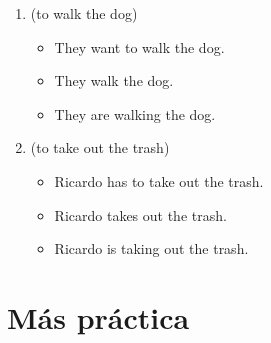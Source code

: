 \begin{enumerate}
\begin{itemize}
		\end{itemize}
	\item {} (to walk the dog)
		\begin{itemize}
			\item {} \arr They want to walk the dog.
			\item {} \arr They walk the dog.
			\item {} \arr They are walking the dog.
		\end{itemize}
	\item {} (to take out the trash)
		\begin{itemize}
			\item {} \arr Ricardo has to take out the trash.
			\item {} \arr Ricardo takes out the trash.
			\item {} \arr Ricardo is taking out the trash.
		\end{itemize}
\end{enumerate}

\section{Más práctica}%
\label{sec:Más práctica}

